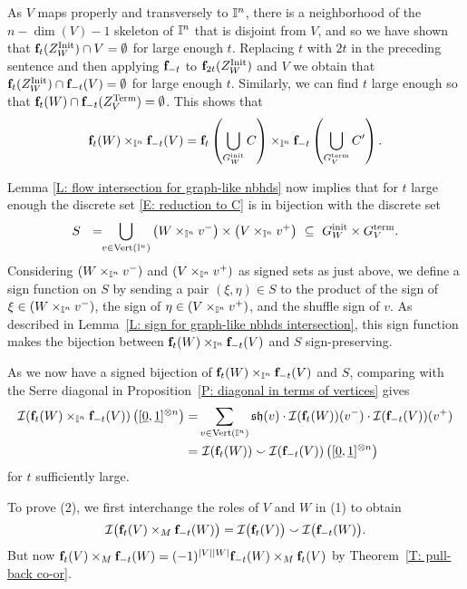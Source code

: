 As $V$ maps properly and transversely to $\mathbb{I}^n$, there is a neighborhood of the $n-\dim(V)-1$ skeleton of $\mathbb{I}^n$ that is disjoint from $V$, and so we have shown that $\mathbf{f}_t(Z_W^{\rm Init}) \cap V = \emptyset$ for large enough $t$.
Replacing $t$ with $2t$ in the preceding sentence and then applying $\mathbf{f}_{-t}$ to $\mathbf{f}_{2t}(Z_W^{\rm Init})$ and $V$ we obtain that $\mathbf{f}_t(Z_W^{\rm Init}) \cap \mathbf{f}_{-t}(V) = \emptyset$ for large enough $t$.
Similarly, we can find $t$ large enough so that $\mathbf{f}_{t}(W) \cap \mathbf{f}_{-t}(Z_V^{\rm Term}) = \emptyset$.
This shows that
\begin{equation}\label{E: reduction to C}
	\mathbf{f}_t(W) \times_{\mathbb{I}^n} \mathbf{f}_{-t}(V) = \mathbf{f}_t \left( \bigcup_{G^{\mathrm{init}}_W} C \right) \times_{\mathbb{I}^n} \mathbf{f}_{-t} \left( \bigcup_{G^{\mathrm{term}}_V} C^\prime \right).
\end{equation}

Lemma \ref{L: flow intersection for graph-like nbhds} now implies that for $t$ large enough the discrete set \eqref{E: reduction to C} is in bijection with the discrete set
\begin{equation*}
	S\ \ =\!\! \bigcup_{v \in {\rm Vert}(\mathbb{I}^n)} \left(W \times_{\mathbb{I}^n} v^-\right) \times \left(V \times_{\mathbb{I}^n} v^+\right) \ \subseteq\ G^{\mathrm{init}}_W \times G^{\mathrm{term}}_V.
\end{equation*}
Considering $\left(W \times_{\mathbb{I}^n} v^-\right)$ and $\left(V \times_{\mathbb{I}^n} v^+\right)$ as signed sets as just above, we define a sign function on $S$ by sending a pair $(\xi, \eta) \in S$ to the product of the sign of $\xi \in \left(W \times_{\mathbb{I}^n} v^-\right)$, the sign of $\eta \in \left(V \times_{\mathbb{I}^n} v^+\right)$, and the shuffle sign of $v$.
As described in Lemma~\ref{L: sign for graph-like nbhds intersection}, this sign function makes the bijection between $\mathbf{f}_t(W) \times_{\mathbb{I}^n} \mathbf{f}_{-t}(V)$ and $S$ sign-preserving.

As we now have a signed bijection of $\mathbf{f}_t(W) \times_{\mathbb{I}^n} \mathbf{f}_{-t}(V)$ and $S$, comparing with the Serre diagonal in Proposition~\ref{P: diagonal in terms of vertices} gives
\begin{align*}
	\mathcal{I} (\mathbf{f}_t(W) \times_{\mathbb{I}^n} \mathbf{f}_{-t}(V)) \left([\underline{0}, \underline{1}]^{\otimes n}\right) = &
	\sum_{v \in {\rm Vert}(\mathbb{I}^n)} \mathfrak{sh}(v) \cdot \mathcal{I}(\mathbf{f}_t(W))(v^-) \cdot \mathcal{I}(\mathbf{f}_{-t}(V))(v^+) \\ = & \
	\mathcal{I}(\mathbf{f}_t(W)) \smallsmile \mathcal{I}(\mathbf{f}_{-t}(V)) \left([\underline{0}, \underline{1}]^{\otimes n}\right)
\end{align*}
for $t$ sufficiently large.

To prove (2), we first interchange the roles of $V$ and $W$ in (1) to obtain
\begin{equation*}
	\mathcal{I} \big( \mathbf{f}_t(V) \times_M \mathbf{f}_{-t}(W) \big) =
	\mathcal{I} \big( \mathbf{f}_t(V) \big) \smallsmile \mathcal{I} \big( \mathbf{f}_{-t}(W) \big).
\end{equation*}
But now $\mathbf{f}_t(V) \times_M \mathbf{f}_{-t}(W)=(-1)^{|V||W|}\mathbf{f}_{-t}(W) \times_M \mathbf{f}_{t}(V)$ by Theorem~\ref{T: pull-back co-or}.
\hfill\qedsymbol
